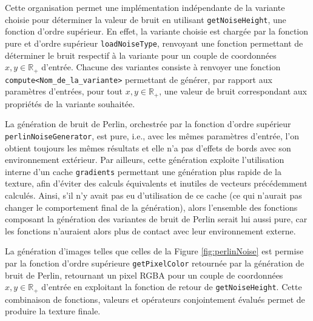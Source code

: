 \documentclass[11pt]{article}
\begin{document}
Cette organisation permet une implémentation indépendante de la variante choisie pour déterminer la valeur de bruit en utilisant \texttt{getNoiseHeight}, une fonction d'ordre supérieur. En effet, la variante choisie est chargée par la fonction pure et d'ordre supérieur \texttt{loadNoiseType}, renvoyant une fonction permettant de déterminer le bruit respectif à la variante pour un couple de coordonnées $x, y \in \mathbb{R}_{+}$ d'entrée. Chacune des variantes consiste à renvoyer une fonction \texttt{compute<Nom\_de\_la\_variante>} permettant de générer, par rapport aux paramètres d'entrées, pour tout $x, y \in \mathbb{R}_{+}$, une valeur de bruit correspondant aux propriétés de la variante souhaitée.


La génération de bruit de Perlin, orchestrée par la fonction d'ordre supérieur \texttt{perlinNoiseGenerator}, est pure, i.e., avec les mêmes paramètres d'entrée, l'on obtient toujours les mêmes résultats et elle n'a pas d'effets de bords avec son environnement extérieur. Par ailleurs, cette génération exploite l'utilisation interne d'un cache \texttt{gradients} permettant une génération plus rapide de la texture, afin d'éviter des calculs équivalents et inutiles de vecteurs précédemment calculés. Ainsi, s'il n'y avait pas eu d'utilisation de ce cache (ce qui n'aurait pas changer le comportement final de la génération), alors l'ensemble des fonctions composant la génération des variantes de bruit de Perlin serait lui aussi pure, car les fonctions n'auraient alors plus de contact avec leur environnement externe.

La génération d'images telles que celles de la Figure \ref{fig:perlinNoise} est permise par la fonction d'ordre supérieure \texttt{getPixelColor} retournée par la génération de bruit de Perlin, retournant un pixel RGBA pour un couple de coordonnées $x, y \in \mathbb{R}_{+}$ d'entrée en exploitant la fonction de retour de \texttt{getNoiseHeight}. Cette combinaison de fonctions, valeurs et opérateurs conjointement évalués permet de produire la texture finale.
\end{document}
